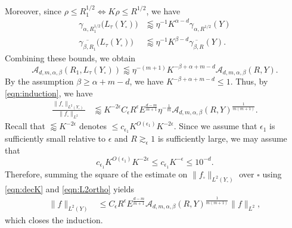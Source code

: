 \documentclass[11pt]{amsart}
\theoremstyle{definition}
\theoremstyle{remark}
\numberwithin{equation}{section}
\newcommand{\sq}{\square}
\newcommand{\less}{\lessapprox}
\newcommand{\eps}{\epsilon}
\begin{document}
Moreover, since $\rho \leq R_1^{1/2} \iff K\rho \leq R^{1/2}$, we have 
\begin{align*}
	\gamma_{\alpha, R_1^{1/2}} \big(L_\tau(Y_\sq) \big) &\less \eta^{-1} K^{\alpha-d}   \gamma_{\alpha,R^{1/2}}(Y) \\
	\overline{\gamma_{\beta, R_1}} \big(L_\tau(Y_\sq)\big) &\less \eta^{-1} K^{\beta-d} \overline{\gamma_{\beta, R}}( Y).
\end{align*}
Combining these bounds, we obtain
\[
	\mathcal{A}_{d,m,\alpha,\beta}(R_1, L_\tau(Y_\sq))  \less \eta^{-(m+1)} K^{-\beta+\alpha+m-d}  \mathcal{A}_{d,m,\alpha,\beta}(R, Y). 
\]
By the assumption $\beta \geq \alpha + m - d$, we have $K^{-\beta+\alpha+m-d}  \leq 1$. Thus, by   \eqref{eqn:induction}, we have 
\begin{align*}
	\frac{\| f_\sq \|_{L^2(Y_\sq)} }{\| f_\sq \|_{L^2}}
	&\less K^{-2\eps}  C_\eps R^\eps E^{\frac{d-m}{m+1}}  \eta^{-\frac1 m} \mathcal{A}_{d,m,\alpha,\beta}(R, Y)^{\frac{1}{m(m+1)}}.
\end{align*}
Recall that $\less K^{-2\eps}$ denotes $\leq c_{\eps_1} K^{O(\eps_1)} K^{-2\eps}$. Since  we  assume that $\eps_1$ is sufficiently small relative to $\eps$ and  $R\gtrsim_\eps 1$ is sufficiently large, we may assume that 
\[ c_{\eps_1} K^{O(\eps_1)} K^{-2\eps}  \leq  c_{\eps_1}	K^{-\eps} \leq 10^{-d}. \]
Therefore, summing the  square of the estimate on $\| f_\sq \|_{L^2(Y_\sq)}$ over $\sq$ using \eqref{eqn:decK} and \eqref{eqn:L2ortho} yields 
\begin{align*}
	\| f\|_{L^2(Y)} &\leq   C_\eps R^\eps E^{\frac{d-m}{m+1}}  \mathcal{A}_{d,m,\alpha,\beta}(R, Y)^{\frac{1}{m(m+1)}} 
	\| f\|_{L^2},
\end{align*}
which closes the induction.
\end{document}
